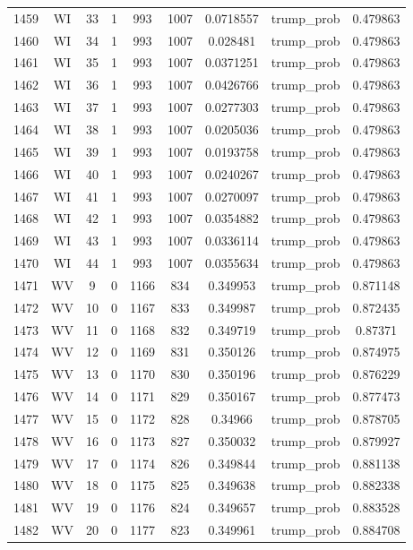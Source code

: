 \documentclass[12pt,a4paper]{article}
\begin{document}
\begin{tabular}{r|cccccccc}
	1459 & WI & 33 & 1 & 993 & 1007 & 0.0718557 & trump\_prob & 0.479863 \\
	1460 & WI & 34 & 1 & 993 & 1007 & 0.028481 & trump\_prob & 0.479863 \\
	1461 & WI & 35 & 1 & 993 & 1007 & 0.0371251 & trump\_prob & 0.479863 \\
	1462 & WI & 36 & 1 & 993 & 1007 & 0.0426766 & trump\_prob & 0.479863 \\
	1463 & WI & 37 & 1 & 993 & 1007 & 0.0277303 & trump\_prob & 0.479863 \\
	1464 & WI & 38 & 1 & 993 & 1007 & 0.0205036 & trump\_prob & 0.479863 \\
	1465 & WI & 39 & 1 & 993 & 1007 & 0.0193758 & trump\_prob & 0.479863 \\
	1466 & WI & 40 & 1 & 993 & 1007 & 0.0240267 & trump\_prob & 0.479863 \\
	1467 & WI & 41 & 1 & 993 & 1007 & 0.0270097 & trump\_prob & 0.479863 \\
	1468 & WI & 42 & 1 & 993 & 1007 & 0.0354882 & trump\_prob & 0.479863 \\
	1469 & WI & 43 & 1 & 993 & 1007 & 0.0336114 & trump\_prob & 0.479863 \\
	1470 & WI & 44 & 1 & 993 & 1007 & 0.0355634 & trump\_prob & 0.479863 \\
	1471 & WV & 9 & 0 & 1166 & 834 & 0.349953 & trump\_prob & 0.871148 \\
	1472 & WV & 10 & 0 & 1167 & 833 & 0.349987 & trump\_prob & 0.872435 \\
	1473 & WV & 11 & 0 & 1168 & 832 & 0.349719 & trump\_prob & 0.87371 \\
	1474 & WV & 12 & 0 & 1169 & 831 & 0.350126 & trump\_prob & 0.874975 \\
	1475 & WV & 13 & 0 & 1170 & 830 & 0.350196 & trump\_prob & 0.876229 \\
	1476 & WV & 14 & 0 & 1171 & 829 & 0.350167 & trump\_prob & 0.877473 \\
	1477 & WV & 15 & 0 & 1172 & 828 & 0.34966 & trump\_prob & 0.878705 \\
	1478 & WV & 16 & 0 & 1173 & 827 & 0.350032 & trump\_prob & 0.879927 \\
	1479 & WV & 17 & 0 & 1174 & 826 & 0.349844 & trump\_prob & 0.881138 \\
	1480 & WV & 18 & 0 & 1175 & 825 & 0.349638 & trump\_prob & 0.882338 \\
	1481 & WV & 19 & 0 & 1176 & 824 & 0.349657 & trump\_prob & 0.883528 \\
	1482 & WV & 20 & 0 & 1177 & 823 & 0.349961 & trump\_prob & 0.884708 \\

\end{tabular}
\end{document}
